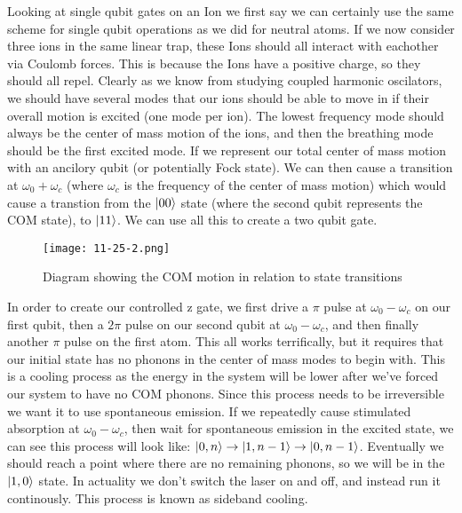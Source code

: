 Looking at single qubit gates on an Ion we first say we can certainly use the same scheme for single qubit operations as we did for neutral atoms. If we now consider three ions in the same linear trap, these Ions should all interact with eachother via Coulomb forces.
This is because the Ions have a positive charge, so they should all repel. Clearly as we know from studying coupled harmonic oscilators, we should have several modes that our ions should be able to move in if their overall motion is excited (one mode per ion).
The lowest frequency mode should always be the center of mass motion of the ions, and then the breathing mode should be the first excited mode. If we represent our total center of mass motion with an ancilory qubit (or potentially Fock state).
We can then cause a transition at $\omega_0 + \omega_c$ (where $\omega_c$ is the frequency of the center of mass motion) which would cause a transtion from the $\ket{00}$ state (where the second qubit represents the COM state), to $\ket{11}$.
We can use all this to create a two qubit gate.
\begin{figure*}[h]
	\centering
	\texttt{[image: 11-25-2.png]}
	\caption*{Diagram showing the COM motion in relation to state transitions}
\end{figure*}
In order to create our controlled z gate, we first drive a $\pi$ pulse at $\omega_0 - \omega_c$ on our first qubit, then a $2\pi$ pulse on our second qubit at $\omega_0 - \omega_c$, and then finally another $\pi$ pulse on the first atom.
This all works terrifically, but it requires that our initial state has no phonons in the center of mass modes to begin with. This is a cooling process as the energy in the system will be lower after we've forced our system to have no COM phonons.
Since this process needs to be irreversible we want it to use spontaneous emission. If we repeatedly cause stimulated absorption at $\omega_0 - \omega_c$, then wait for spontaneous emission in the excited state, we can see this process will look like:
$\ket{0,n}\to\ket{1,n-1}\to\ket{0,n-1}$. Eventually we should reach a point where there are no remaining phonons, so we will be in the $\ket{1,0}$ state. In actuality we don't switch the laser on and off, and instead run it continously.
This process is known as sideband cooling.
